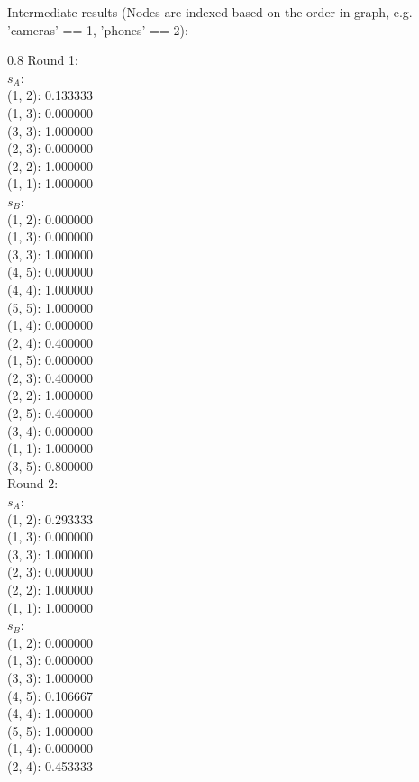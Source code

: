 \documentclass{article}
\newenvironment{myenv}[1]
  {\begin{spacing}{#1}}
  {\end{spacing}}
\begin{document}
Intermediate results (Nodes are indexed based on the order in graph, e.g. 'cameras' == 1, 'phones' == 2): \\
\begin{myenv}{0.8}
Round 1:\\ 
$s_A$:\\
(1, 2): 0.133333 \\
(1, 3): 0.000000 \\
(3, 3): 1.000000 \\
(2, 3): 0.000000 \\
(2, 2): 1.000000 \\
(1, 1): 1.000000 \\
$s_B$:\\
(1, 2): 0.000000 \\
(1, 3): 0.000000 \\
(3, 3): 1.000000 \\
(4, 5): 0.000000 \\
(4, 4): 1.000000 \\
(5, 5): 1.000000 \\
(1, 4): 0.000000 \\
(2, 4): 0.400000 \\
(1, 5): 0.000000 \\
(2, 3): 0.400000 \\
(2, 2): 1.000000 \\
(2, 5): 0.400000 \\
(3, 4): 0.000000 \\
(1, 1): 1.000000 \\
(3, 5): 0.800000 \\
Round 2:\\ 
$s_A$:\\
(1, 2): 0.293333 \\
(1, 3): 0.000000 \\
(3, 3): 1.000000 \\
(2, 3): 0.000000 \\
(2, 2): 1.000000 \\
(1, 1): 1.000000 \\
$s_B$:\\
(1, 2): 0.000000 \\
(1, 3): 0.000000 \\
(3, 3): 1.000000 \\
(4, 5): 0.106667 \\
(4, 4): 1.000000 \\
(5, 5): 1.000000 \\
(1, 4): 0.000000 \\
(2, 4): 0.453333 \\

\end{myenv}
\end{document}
